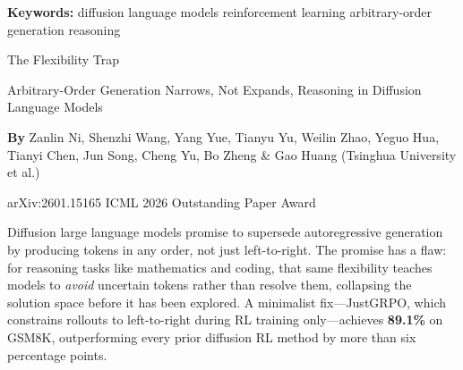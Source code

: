 \documentclass[10pt,twocolumn]{article}
\begin{document}
\setlength{\parindent}{0pt}
\setlength{\parskip}{4pt}

{\small\color{keywordgray}\textbf{Keywords:}
  diffusion language models \textbullet{}
  reinforcement learning \textbullet{}
  arbitrary-order generation \textbullet{}
  reasoning}\par\vspace{4pt}

{\LARGE\bfseries\raggedright
  The Flexibility Trap}\par\vspace{4pt}

{\large\itshape\raggedright
  Arbitrary-Order Generation Narrows, Not Expands, Reasoning
  in Diffusion Language Models}\par\vspace{6pt}

{\small\textbf{By} Zanlin Ni, Shenzhi Wang, Yang Yue, Tianyu Yu, Weilin Zhao,
  Yeguo Hua, Tianyi Chen, Jun Song, Cheng Yu, Bo Zheng \& Gao Huang
  (Tsinghua University et al.)}\par\vspace{2pt}

{\small\color{keywordgray}arXiv:2601.15165 \textbullet{}
  ICML 2026 Outstanding Paper Award}
\par\vspace{2pt}\noindent{\color{rulered}\rule{\columnwidth}{0.6pt}}\vspace{6pt}

Diffusion large language models promise to supersede autoregressive generation by
producing tokens in any order, not just left-to-right. The promise has a flaw:
for reasoning tasks like mathematics and coding, that same flexibility teaches
models to \emph{avoid} uncertain tokens rather than resolve them, collapsing the
solution space before it has been explored. A minimalist fix---JustGRPO,
which constrains rollouts to left-to-right during RL training only---achieves
\textbf{89.1\%} on GSM8K, outperforming every prior diffusion RL method by more
than six percentage points.
\end{document}

